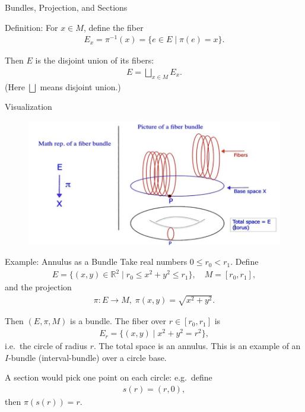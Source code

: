 \begin{frame}{Bundles, Projection, and Sections}

\begin{block}{Definition:} For \(x \in M\), define the fiber
\begin{align*}
E_x = \pi^{-1}(x) = \{ e \in E \mid \pi(e) = x \}.
\end{align*}

Then \(E\) is the disjoint union of its fibers:
\begin{align*}
E = \bigsqcup_{x \in M} E_x.
\end{align*}
(Here \(\bigsqcup\) means disjoint union.)
\end{block}

\end{frame}


\begin{frame}{Visualization}
\begin{figure}
    \centering
    \includegraphics[width=0.85\linewidth]{Image5.png}
\end{figure}

\end{frame}


\begin{frame}{Example: Annulus as a Bundle}
Take real numbers \(0 \le r_0 < r_1\). Define
\begin{align*}
E = \{ (x,y) \in \mathbb{R}^2 \mid r_0 \le x^2 + y^2 \le r_1 \}, \quad
M = [r_0, r_1],
\end{align*}
and the projection
\begin{align*}
\pi: E \to M,\; \pi(x,y) = \sqrt{x^2 + y^2}.
\end{align*}

Then \((E, \pi, M)\) is a bundle. The fiber over \(r\in [r_0,r_1]\) is
\begin{align*}
E_r = \{ (x,y) \mid x^2 + y^2 = r^2 \},
\end{align*}
i.e.\ the circle of radius \(r\). The total space is an annulus. This is an example of an \(I\)-bundle (interval-bundle) over a circle base.

A section would pick one point on each circle: e.g.\ define
\begin{align*}
s(r) = (r, 0),
\end{align*}
then \(\pi(s(r)) = r\).
\end{frame}

